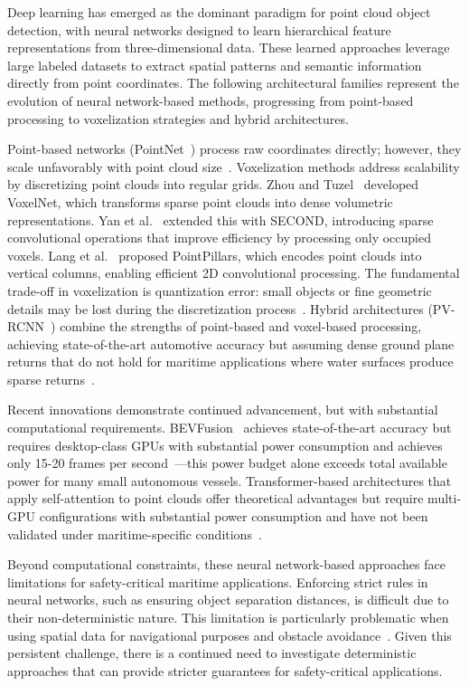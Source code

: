 \documentclass{erauthesis}
\begin{document}
Deep learning has emerged as the dominant paradigm for point cloud object detection, with neural networks designed to learn hierarchical feature representations from three-dimensional data.
These learned approaches leverage large labeled datasets to extract spatial patterns and semantic information directly from point coordinates.
The following architectural families represent the evolution of neural network-based methods, progressing from point-based processing to voxelization strategies and hybrid architectures.

Point-based networks (PointNet~\cite{qi2017}) process raw coordinates directly; however, they scale unfavorably with point cloud size~\cite{shi2019}.
Voxelization methods address scalability by discretizing point clouds into regular grids.
Zhou and Tuzel~\cite{zhou2018} developed VoxelNet, which transforms sparse point clouds into dense volumetric representations.
Yan et al.~\cite{yan2018} extended this with SECOND, introducing sparse convolutional operations that improve efficiency by processing only occupied voxels.
Lang et al.~\cite{lang2019} proposed PointPillars, which encodes point clouds into vertical columns, enabling efficient 2D convolutional processing.
The fundamental trade-off in voxelization is quantization error: small objects or fine geometric details may be lost during the discretization process~\cite {zhou2018}.
Hybrid architectures (PV-RCNN~\cite{shi2019, shi2020}) combine the strengths of point-based and voxel-based processing, achieving state-of-the-art automotive accuracy but assuming dense ground plane returns that do not hold for maritime applications where water surfaces produce sparse returns~\cite{kunz2005}.

Recent innovations demonstrate continued advancement, but with substantial computational requirements.
BEVFusion~\cite{liang2022, liu2023b} achieves state-of-the-art accuracy but requires desktop-class GPUs with substantial power consumption and achieves only 15-20 frames per second~\cite{liu2023b}—this power budget alone exceeds total available power for many small autonomous vessels.
Transformer-based architectures that apply self-attention to point clouds offer theoretical advantages but require multi-GPU configurations with substantial power consumption and have not been validated under maritime-specific conditions~\cite{xie2024}.

Beyond computational constraints, these neural network-based approaches face limitations for safety-critical maritime applications.
Enforcing strict rules in neural networks, such as ensuring object separation distances, is difficult due to their non-deterministic nature.
This limitation is particularly problematic when using spatial data for navigational purposes and obstacle avoidance~\cite{coyleE}.
Given this persistent challenge, there is a continued need to investigate deterministic approaches that can provide stricter guarantees for safety-critical applications. 
\end{document}
